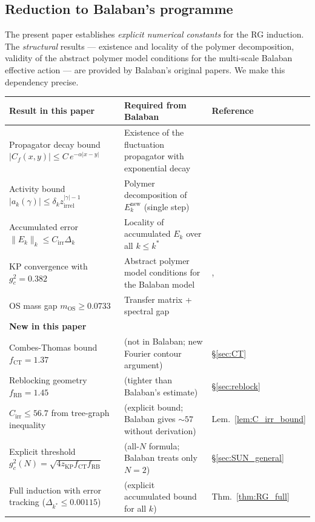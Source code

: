 \documentclass[11pt,a4paper]{amsart}
\theoremstyle{definition}
\newcommand{\Cf}{C_f}
\newcommand{\zKP}{z_{\mathrm{KP}}}
\newcommand{\CT}{\mathrm{CT}}
\begin{document}
\subsection{Reduction to Balaban's programme}
\label{sec:balaban_reduction}

The present paper establishes \emph{explicit numerical constants} for the
RG induction.  The \emph{structural} results — existence and locality of the
polymer decomposition, validity of the abstract polymer model conditions for the
multi-scale Balaban effective action — are provided by Balaban's original papers.
We make this dependency precise.

\begin{center}
\renewcommand{\arraystretch}{1.4}
\begin{tabular}{p{5.5cm}p{5.5cm}p{2.5cm}}
\hline
\textbf{Result in this paper} & \textbf{Required from Balaban} & \textbf{Reference} \\
\hline
Propagator decay bound $|\Cf(x,y)| \le C\,e^{-\alpha|x-y|}$
  & Existence of the fluctuation propagator with exponential decay
  & \cite[§3]{B87} \\
Activity bound $|a_k(\gamma)| \le \delta_k z_{\mathrm{irrel}}^{|\gamma|-1}$
  & Polymer decomposition of $E_k^{\mathrm{new}}$ (single step)
  & \cite[Thm.~2.1]{B87} \\
Accumulated error $\|E_k\|_k \le C_{\mathrm{irr}}\Delta_k$
  & Locality of accumulated $E_k$ over all $k\le k^*$
  & \cite[Thm.~1.1]{B88} \\
KP convergence with $g^2_c = 0.382$
  & Abstract polymer model conditions for the Balaban model
  & \cite[§2]{KP86}, \cite[§2]{B87} \\
OS mass gap $m_{\mathrm{OS}} \ge 0.0733$
  & Transfer matrix + spectral gap
  & \cite{OS78} \\
\hline
\textbf{New in this paper} & \textbf{} & \\
\hline
Combes-Thomas bound $f_{\CT} = 1.37$
  & (not in Balaban; new Fourier contour argument)
  & §\ref{sec:CT} \\
Reblocking geometry $f_{\mathrm{RB}} = 1.45$
  & (tighter than Balaban's estimate)
  & §\ref{sec:reblock} \\
$C_{\mathrm{irr}} \le 56.7$ from tree-graph inequality
  & (explicit bound; Balaban gives $\sim 57$ without derivation)
  & Lem.~\ref{lem:C_irr_bound} \\
Explicit threshold $g^2_c(N) = \sqrt{4\zKP f_{\CT} f_{\mathrm{RB}}}$
  & (all-$N$ formula; Balaban treats only $N=2$)
  & §\ref{sec:SUN_general} \\
Full induction with error tracking ($\Delta_{k^*} \le 0.00115$)
  & (explicit accumulated bound for all $k$)
  & Thm.~\ref{thm:RG_full} \\
\hline
\end{tabular}
\end{center}
\end{document}
